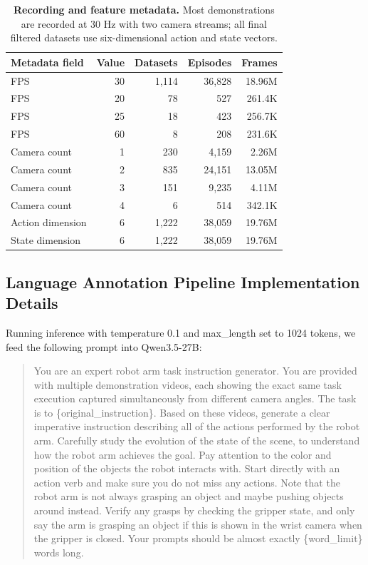 \begin{table}[t]
\centering
\footnotesize
\caption{\textbf{Recording and feature metadata.} Most demonstrations are
recorded at 30 Hz with two camera streams; all final filtered datasets use
six-dimensional action and state vectors.}
\setlength{\tabcolsep}{6pt}
\renewcommand{\arraystretch}{1.1}
\begin{tabular}{lrrrr}
\textbf{Metadata field} & \textbf{Value} & \textbf{Datasets} & \textbf{Episodes} & \textbf{Frames} \\
\midrule
FPS & 30 & 1{,}114 & 36{,}828 & 18.96M \\
FPS & 20 & 78 & 527 & 261.4K \\
FPS & 25 & 18 & 423 & 256.7K \\
FPS & 60 & 8 & 208 & 231.6K \\
Camera count & 1 & 230 & 4{,}159 & 2.26M \\
Camera count & 2 & 835 & 24{,}151 & 13.05M \\
Camera count & 3 & 151 & 9{,}235 & 4.11M \\
Camera count & 4 & 6 & 514 & 342.1K \\
Action dimension & 6 & 1{,}222 & 38{,}059 & 19.76M \\
State dimension & 6 & 1{,}222 & 38{,}059 & 19.76M \\
\end{tabular}
\label{tab:so100-so101-metadata}
\end{table}

\subsection{Language Annotation Pipeline Implementation Details}
\label{supp:language-annotation-details}
Running inference with temperature 0.1 and max\_length set to 1024 tokens, we feed the following prompt into Qwen3.5-27B:
\begin{quote} 
You are an expert robot arm task instruction generator. You are provided with multiple demonstration videos, each showing the exact same task execution captured simultaneously from different camera angles. The task is to \{original\_instruction\}. Based on these videos, generate a clear imperative instruction describing all of the actions performed by the robot arm. Carefully study the evolution of the state of the scene, to understand how the robot arm achieves the goal. Pay attention to the color and position of the objects the robot interacts with. Start directly with an action verb and make sure you do not miss any actions. Note that the robot arm is not always grasping an object and maybe pushing objects around instead. Verify any grasps by checking the gripper state, and only say the arm is grasping an object if this is shown in the wrist camera when the gripper is closed. Your prompts should be almost exactly \{word\_limit\} words long.
\end{quote}

